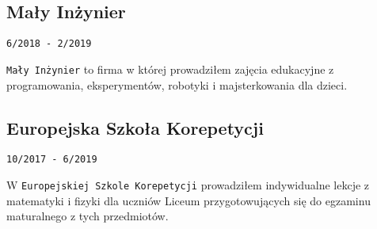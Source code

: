 \documentclass{article}
\begin{document}
\begin{minipage}[t]{.5\textwidth}
	\subsection{Mały Inżynier}
	\texttt{6/2018 - 2/2019}
	\par\texttt{Mały Inżynier} to firma w której prowadziłem zajęcia edukacyjne z programowania, eksperymentów, robotyki i majsterkowania dla dzieci.

	\subsection{Europejska Szkoła Korepetycji}
	\texttt{10/2017 - 6/2019}
	\par W \texttt{Europejskiej Szkole Korepetycji} prowadziłem indywidualne lekcje z matematyki i fizyki dla uczniów Liceum przygotowujących się do egzaminu maturalnego z tych przedmiotów.

\end{minipage}\hfill
\end{document}

